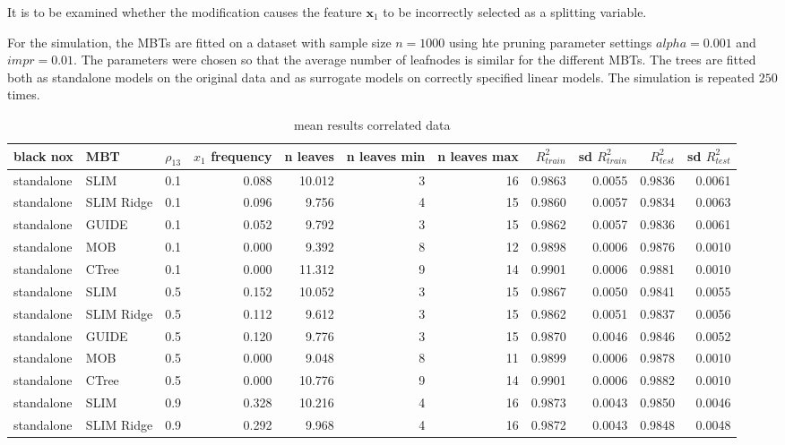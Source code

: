               
It is to be examined whether the modification causes the feature $\textbf{x}_1$ to be incorrectly selected as a splitting variable.


For the simulation, the MBTs are fitted on a dataset with sample size $ n = 1000$ using hte pruning parameter settings $alpha = 0.001$ and $impr = 0.01$. The parameters were chosen so that the average number of leafnodes is similar for the different MBTs. The trees are fitted both as standalone models on the original data and as surrogate models on correctly specified linear models. The simulation is repeated $250$ times.


\begin{table}[!htb]
\caption{mean results correlated data}
\centering \tiny
\begin{tabular}[t]{l|l|r|r|r|r|r|r|r|r|r}
\hline
black nox & MBT & $\rho_{13}$ & $x_1$ frequency & n leaves & n leaves min & n leaves max & $R^2_{train}$  & sd $R^2_{train}$ & $R^2_{test}$ & sd $R^2_{test}$ \\
\hline
standalone & SLIM & 0.1 & 0.088 & 10.012 & 3 & 16 & 0.9863 & 0.0055 & 0.9836 & 0.0061\\
standalone & SLIM Ridge & 0.1 & 0.096 & 9.756 & 4 & 15 & 0.9860 & 0.0057 & 0.9834 & 0.0063\\
standalone & GUIDE & 0.1 & 0.052 & 9.792 & 3 & 15 & 0.9862 & 0.0057 & 0.9836 & 0.0061\\
standalone & MOB & 0.1 & 0.000 & 9.392 & 8 & 12 & 0.9898 & 0.0006 & 0.9876 & 0.0010\\
standalone & CTree & 0.1 & 0.000 & 11.312 & 9 & 14 & 0.9901 & 0.0006 & 0.9881 & 0.0010\\
\hline
standalone & SLIM & 0.5 & 0.152 & 10.052 & 3 & 15 & 0.9867 & 0.0050 & 0.9841 & 0.0055\\
standalone & SLIM Ridge & 0.5 & 0.112 & 9.612 & 3 & 15 & 0.9862 & 0.0051 & 0.9837 & 0.0056\\
standalone & GUIDE & 0.5 & 0.120 & 9.776 & 3 & 15 & 0.9870 & 0.0046 & 0.9846 & 0.0052\\
standalone & MOB & 0.5 & 0.000 & 9.048 & 8 & 11 & 0.9899 & 0.0006 & 0.9878 & 0.0010\\
standalone & CTree & 0.5 & 0.000 & 10.776 & 9 & 14 & 0.9901 & 0.0006 & 0.9882 & 0.0010\\
\hline
standalone & SLIM & 0.9 & 0.328 & 10.216 & 4 & 16 & 0.9873 & 0.0043 & 0.9850 & 0.0046\\
standalone & SLIM Ridge & 0.9 & 0.292 & 9.968 & 4 & 16 & 0.9872 & 0.0043 & 0.9848 & 0.0048\\

\end{tabular}
\end{table}
